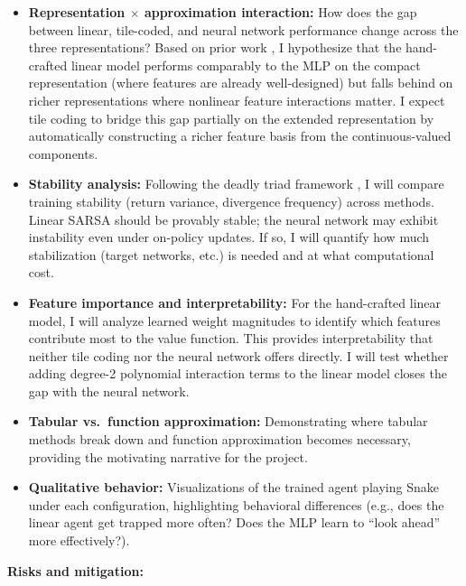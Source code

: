 \documentclass[11pt]{article}
\begin{document}
\begin{itemize}
    \item \textbf{Representation $\times$ approximation interaction:} How does the gap between linear, tile-coded, and neural network performance change across the three representations? Based on prior work \citep{liang2016shallow, elfwing2018sigmoid, jiang2021snakeai}, I hypothesize that the hand-crafted linear model performs comparably to the MLP on the compact representation (where features are already well-designed) but falls behind on richer representations where nonlinear feature interactions matter. I expect tile coding to bridge this gap partially on the extended representation by automatically constructing a richer feature basis from the continuous-valued components.

    \item \textbf{Stability analysis:} Following the deadly triad framework \citep{sutton2018reinforcement, vanhasselt2018deadly}, I will compare training stability (return variance, divergence frequency) across methods. Linear SARSA should be provably stable; the neural network may exhibit instability even under on-policy updates. If so, I will quantify how much stabilization (target networks, etc.) is needed and at what computational cost.

    \item \textbf{Feature importance and interpretability:} For the hand-crafted linear model, I will analyze learned weight magnitudes to identify which features contribute most to the value function. This provides interpretability that neither tile coding nor the neural network offers directly. I will test whether adding degree-2 polynomial interaction terms to the linear model closes the gap with the neural network.

    \item \textbf{Tabular vs.\ function approximation:} Demonstrating where tabular methods break down and function approximation becomes necessary, providing the motivating narrative for the project.

    \item \textbf{Qualitative behavior:} Visualizations of the trained agent playing Snake under each configuration, highlighting behavioral differences (e.g., does the linear agent get trapped more often? Does the MLP learn to ``look ahead'' more effectively?).
\end{itemize}

\textbf{Risks and mitigation:}
\end{document}

